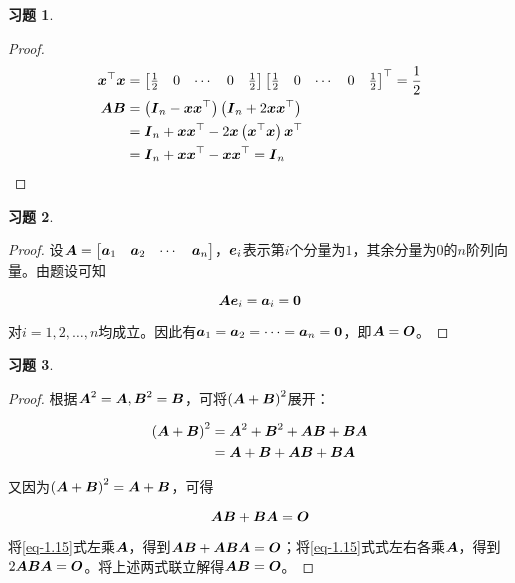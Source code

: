 \documentclass{ctexart}
\newtheorem{problem}{习题}[section]
\begin{document}
\begin{problem}
\end{problem}
\begin{proof}
    \begin{align*}
        \boldsymbol{x}^\top\boldsymbol{x} & =
        \begin{bmatrix}
            \frac{1}{2} & 0 & \cdots & 0 & \frac{1}{2}
        \end{bmatrix}
        \begin{bmatrix}
            \frac{1}{2} & 0 & \cdots & 0 & \frac{1}{2}
        \end{bmatrix}^\top=\frac{1}{2}                                        \\
        \boldsymbol{A}\boldsymbol{B}      & =\left( \boldsymbol{I}_n-\boldsymbol{x}\boldsymbol{x}^\top \right)\left( \boldsymbol{I}_n+2\boldsymbol{x}\boldsymbol{x}^\top \right) \\
                        & =\boldsymbol{I}_n+\boldsymbol{x}\boldsymbol{x}^\top-2\boldsymbol{x}\left( \boldsymbol{x}^\top\boldsymbol{x} \right)\boldsymbol{x}^\top \\
                        & =\boldsymbol{I}_n+\boldsymbol{x}\boldsymbol{x}^\top-\boldsymbol{x}\boldsymbol{x}^\top=\boldsymbol{I}_n
    \end{align*}
\end{proof}

\begin{problem}
\end{problem}
\begin{proof}
    设\(\boldsymbol{A}=\begin{bmatrix}\boldsymbol{a}_1&\boldsymbol{a}_2&\cdots&\boldsymbol{a}_n\end{bmatrix}\)，\(\boldsymbol{e}_i\)表示第\(i\)个分量为\(1\)，其余分量为\(0\)的\(n\)阶列向量。由题设可知

    \begin{equation*}
        \boldsymbol{A}\boldsymbol{e}_i=\boldsymbol{a}_i=\boldsymbol{0}
    \end{equation*}

    对\(i=1,2,\dots,n\)均成立。因此有\(\boldsymbol{a}_1=\boldsymbol{a}_2=\cdots=\boldsymbol{a}_n=\boldsymbol{0}\)，即\(\boldsymbol{A}=\boldsymbol{O}\)。
\end{proof}

\begin{problem}
\end{problem}
\begin{proof}
    根据\(\boldsymbol{A}^2=\boldsymbol{A},\boldsymbol{B}^2=\boldsymbol{B}\)，可将\(\left( \boldsymbol{A}+\boldsymbol{B} \right)^2\)展开：

    \begin{align*}
        \left( \boldsymbol{A}+\boldsymbol{B} \right)^2 & =\boldsymbol{A}^2+\boldsymbol{B}^2+\boldsymbol{A}\boldsymbol{B}+\boldsymbol{B}\boldsymbol{A} \\
                              & =\boldsymbol{A}+\boldsymbol{B}+\boldsymbol{A}\boldsymbol{B}+\boldsymbol{B}\boldsymbol{A}
    \end{align*}

    又因为\(\left( \boldsymbol{A}+\boldsymbol{B} \right)^2=\boldsymbol{A}+\boldsymbol{B}\)，可得

    \begin{equation}\label{eq-1.15}
        \boldsymbol{A}\boldsymbol{B}+\boldsymbol{B}\boldsymbol{A}=\boldsymbol{O}
    \end{equation}

    将\eqref{eq-1.15}式左乘\(\boldsymbol{A}\)，得到\(\boldsymbol{A}\boldsymbol{B}+\boldsymbol{A}\boldsymbol{B}\boldsymbol{A}=\boldsymbol{O}\)；将\eqref{eq-1.15}式式左右各乘\(\boldsymbol{A}\)，得到\(2\boldsymbol{A}\boldsymbol{B}\boldsymbol{A}=\boldsymbol{O}\)。将上述两式联立解得\(\boldsymbol{A}\boldsymbol{B}=\boldsymbol{O}\)。
\end{proof}
\end{document}

